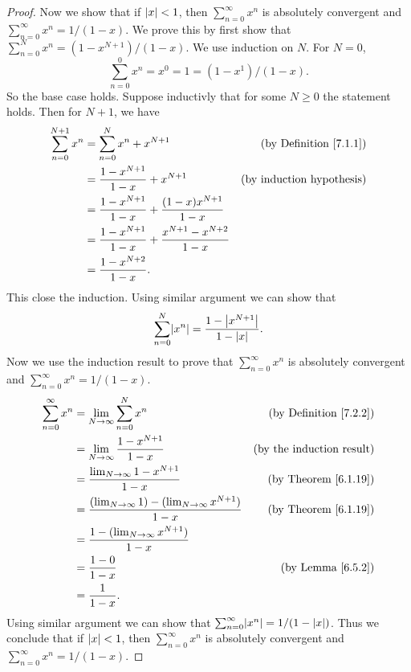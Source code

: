 \begin{proof}
Now we show that if \(\abs*{x} < 1\), then \(\sum_{n = 0}^\infty x^n\) is absolutely convergent and \(\sum_{n = 0}^\infty x^n = 1 / (1 - x)\).
We prove this by first show that \(\sum_{n = 0}^N x^n = (1 - x^{N + 1}) / (1 - x)\).
We use induction on \(N\).
For \(N = 0\),
\[
    \sum_{n = 0}^0 x^n = x^0 = 1 = (1 - x^1) / (1 - x).
\]
So the base case holds.
Suppose inductivly that for some \(N \geq 0\) the statement holds.
Then for \(N + 1\), we have
\begin{align*}
\sum_{n = 0}^{N + 1} x^n &= \sum_{n = 0}^N x^n + x^{N + 1} & \text{(by Definition \ref{7.1.1})} \\
&= \frac{1 - x^{N + 1}}{1 - x} + x^{N + 1} & \text{(by induction hypothesis)} \\
&= \frac{1 - x^{N + 1}}{1 - x} + \frac{(1 - x) x^{N + 1}}{1 - x} \\
&= \frac{1 - x^{N + 1}}{1 - x} + \frac{x^{N + 1} - x^{N + 2}}{1 - x} \\
&= \frac{1 - x^{N + 2}}{1 - x}.
\end{align*}
This close the induction.
Using similar argument we can show that
\[
    \sum_{n = 0}^N \abs*{x^n} = \frac{1 - \abs*{x^{N + 1}}}{1 - \abs*{x}}.
\]
Now we use the induction result to prove that \(\sum_{n = 0}^\infty x^n\) is absolutely convergent and \(\sum_{n = 0}^\infty x^n = 1 / (1 - x)\).
\begin{align*}
\sum_{n = 0}^\infty x^n &= \lim_{N \to \infty} \sum_{n = 0}^N x^n & \text{(by Definition \ref{7.2.2})} \\
&= \lim_{N \to \infty} \frac{1 - x^{N + 1}}{1 - x} & \text{(by the induction result)} \\
&= \frac{\lim_{N \to \infty} 1 - x^{N + 1}}{1 - x} & \text{(by Theorem \ref{6.1.19})} \\
&= \frac{(\lim_{N \to \infty} 1) - (\lim_{N \to \infty} x^{N + 1})}{1 - x} & \text{(by Theorem \ref{6.1.19})} \\
&= \frac{1 - (\lim_{N \to \infty} x^{N + 1})}{1 - x} \\
&= \frac{1 - 0}{1 - x} & \text{(by Lemma \ref{6.5.2})} \\
&= \frac{1}{1 - x}.
\end{align*}
Using similar argument we can show that \(\sum_{n = 0}^\infty \abs*{x^n} = 1 / (1 - \abs*{x})\).
Thus we conclude that if \(\abs*{x} < 1\), then \(\sum_{n = 0}^\infty x^n\) is absolutely convergent and \(\sum_{n = 0}^\infty x^n = 1 / (1 - x)\).
\end{proof}